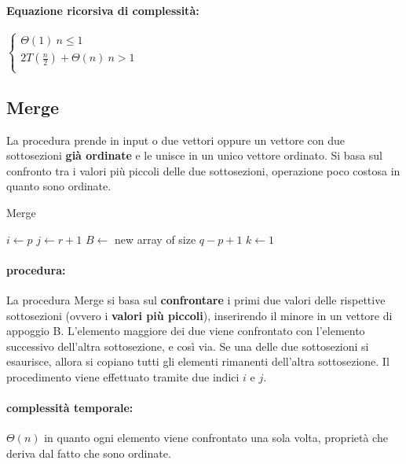 \documentclass{article}
\begin{document}
\paragraph{Equazione ricorsiva di complessità:}
$\begin{cases}
    \Theta(1) \ n \leq 1\\
    2T(\frac{n}{2}) + \Theta(n) \ n > 1\\
\end{cases}$
\newpage
\hypertarget{merge}{} \subsection{Merge} %
La procedura prende in input o due vettori oppure un vettore con due sottosezioni \textbf{già ordinate} e le unisce in un unico vettore ordinato. 
Si basa sul confronto tra i valori più piccoli delle due sottosezioni, operazione poco costosa in quanto sono ordinate.

\begin{algorithm}[H]
\caption{Merge}
$i \leftarrow p$\;
$j \leftarrow r + 1$\;
$B \leftarrow$ new array of size $q - p + 1$\;
$k \leftarrow 1$\;
\end{algorithm}
\paragraph{procedura:}
La procedura Merge si basa sul \textbf{confrontare} i primi due valori delle rispettive sottosezioni (ovvero i \textbf{valori più piccoli}), inserirendo il minore in un vettore di appoggio B. L'elemento maggiore dei due viene 
confrontato con l'elemento successivo dell'altra sottosezione, e così via. Se una delle due sottosezioni si esaurisce, allora si copiano tutti gli elementi rimanenti dell'altra sottosezione. 
Il procedimento viene effettuato tramite due indici $i$ e $j$.

\paragraph{complessità temporale:} $\Theta(n)$ in quanto ogni elemento viene confrontato una sola volta, proprietà che deriva dal fatto che sono ordinate.
\end{document}

